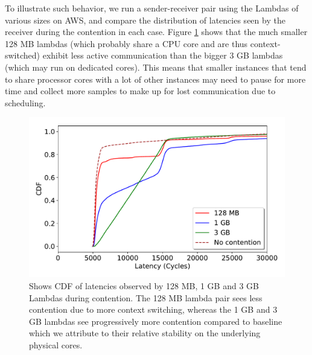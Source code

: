 To illustrate such behavior, we run a sender-receiver pair using the
Lambdas\cite{awslambda} of various sizes on AWS, and compare the distribution of
latencies seen by the receiver during the contention in each case. Figure
\ref{fig:context_switching} shows that the much smaller 128 MB lambdas (which
probably share a CPU core and are thus context-switched) exhibit less active
communication than the bigger 3 GB lambdas (which may run on dedicated cores).
This means that smaller instances that tend to share processor cores with a lot
of other instances may need to pause for more time and collect more samples to
make up for lost communication due to scheduling.


\begin{figure}[!t]
  \includegraphics[width=.99\linewidth]{fig/lambda_sched_effect.pdf}
  \caption{Shows CDF of latencies observed by 128 MB, 1 GB and 3 GB Lambdas during 
  contention. The 128 MB lambda pair sees less contention due to more context switching, 
  whereas the 1 GB and 3 GB lambdas see progressively more contention compared to baseline 
  which we attribute to their relative stability on the underlying physical cores. 
\label{fig:context_switching}}
\end{figure}

